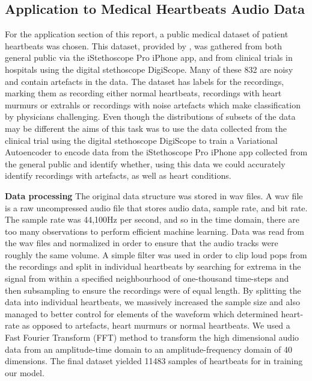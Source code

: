\documentclass[12pt]{article}
\begin{document}
\newpage

\subsection{Application to Medical Heartbeats Audio Data}
For the application section of this report, a public medical dataset of patient heartbeats was chosen. This dataset, provided by \citet{pascal-chsc-2011}, was gathered from both general public via the iStethoscope Pro iPhone app, and from clinical trials in hospitals using the digital stethoscope DigiScope. Many of these 832 are noisy and contain artefacts in the data. The dataset has labels for the recordings, marking them as recording either normal heartbeats, recordings with heart murmurs or extrahls or recordings with noise artefacts which make classification by physicians challenging. Even though the distributions of subsets of the data may be different the aims of this task was to use the data collected from the clinical trial using the digital stethoscope DigiScope to train a Variational Autoencoder to encode data from the iStethoscope Pro iPhone app collected from the general public and identify whether, using this data we could accurately identify recordings with artefacts, as well as heart conditions.  

\textbf{Data processing}\newline
The original data structure was stored in wav files. A wav file is a raw uncompressed audio file that stores audio data, sample rate, and bit rate. The sample rate was 44,100Hz per second, and so in the time domain, there are too many observations to perform efficient machine learning. Data was read from the wav files and normalized in order to ensure that the audio tracks were roughly the same volume.  A simple filter was used in order to clip loud pops from the recordings and split in individual heartbeats by searching for extrema in the signal from within a specified neighbourhood of one-thousand time-steps and then subsampling to ensure the recordings were of equal length.  By splitting the data into individual heartbeats, we massively increased the sample size and also managed to better control for elements of the waveform which determined heart-rate as opposed to artefacts, heart murmurs or normal heartbeats.  We used a Fast Fourier Transform (FFT) method to transform the high dimensional audio data from an amplitude-time domain to an amplitude-frequency domain of 40 dimensions. The final dataset yielded 11483 samples of heartbeats for in training our model.  
\end{document}
